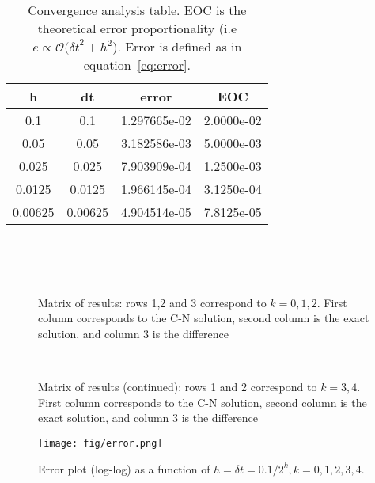 \documentclass[10pt]{article}
\begin{document}
\begin{table}
\centering
  \begin{tabular}{c | c | c | c}
 h        &    dt    &   error       &  EOC           \\  \hline
0.1       &0.1       &1.297665e-02   &2.0000e-02      \\
0.05      &0.05      &3.182586e-03   &5.0000e-03      \\
0.025     &0.025     &7.903909e-04   &1.2500e-03      \\
0.0125    &0.0125    &1.966145e-04   &3.1250e-04      \\
0.00625   &0.00625   &4.904514e-05   &7.8125e-05       
  \end{tabular}
\caption{Convergence analysis table. EOC is the theoretical error proportionality (i.e $e \propto \mathcal{O}({\delta t}^2+{h}^2$). Error is defined as in equation~\ref{eq:error}.}
\label{tab:table}
\end{table}



\begin{figure}
  \centering
   \\
   \\ 
   \\
  \caption{Matrix of results: rows 1,2 and 3 correspond to $k=0,1,2$. First column %
          corresponds to the C-N solution, second column is the exact solution, and
          column 3 is the difference}
  \label{fig:results1}
\end{figure}
\begin{figure}
   \\
  \caption{Matrix of results (continued): rows 1 and 2 correspond to $k=3,4$. First column %
          corresponds to the C-N solution, second column is the exact solution, and
          column 3 is the difference }
  \label{fig:results2}
\end{figure}

\begin{figure}
  \texttt{[image: fig/error.png]}
\caption{Error plot (log-log) as a function of $h=\delta t = 0.1/2^k, k=0,1,2,3,4$.}
\label{fig:error}
\end{figure}
\end{document}
